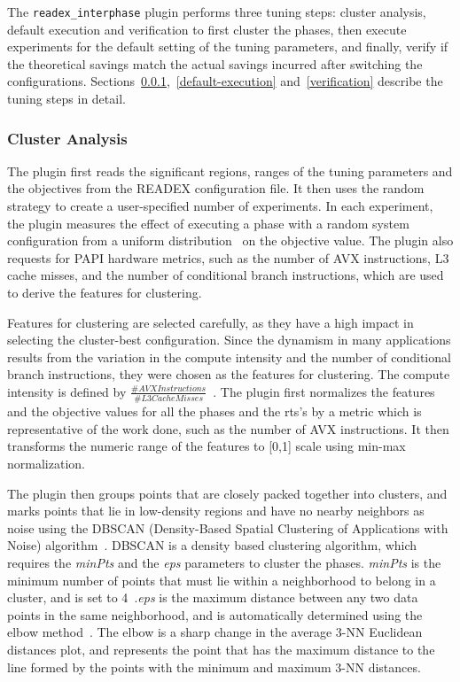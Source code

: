 The \texttt{readex\_interphase} plugin performs three tuning steps: cluster analysis, default execution and verification to first cluster the phases, then execute experiments for the default setting of the tuning parameters, and finally, verify if the theoretical savings match the actual savings incurred after switching the configurations. Sections~\ref{cluster-analysis},~\ref{default-execution} and~\ref{verification} describe the tuning steps in detail.

\subsubsection{Cluster Analysis} \label{cluster-analysis} 
The plugin first reads the significant regions, ranges of the tuning parameters and the objectives from the READEX configuration file. It then uses the random strategy to create a user-specified number of experiments. In each experiment, the plugin measures the effect of executing a phase with a random system configuration from a uniform distribution~\cite{AutoTune:Book2015} on the objective value. The plugin also requests for PAPI hardware metrics, such as the number of AVX instructions, L3 cache misses, and the number of conditional branch instructions, which are used to derive the features for clustering.

Features for clustering are selected carefully, as they have a high impact in selecting the cluster-best configuration. Since the dynamism in many applications results from the variation in the compute intensity and the number of conditional branch instructions, they were chosen as the features for clustering. The compute intensity is defined by $\frac{\#AVX Instructions}{\#L3 Cache Misses}$~\cite{PDPTA_18_Kumaraswamy}. The plugin first normalizes the features and the objective values for all the phases and the rts’s by a metric which is representative of the work done, such as the number of AVX instructions. It then transforms the numeric range of the features to [0,1] scale using min-max normalization.

The plugin then groups points that are closely packed together into clusters, and marks points that lie in low-density regions and have no nearby neighbors as noise using the DBSCAN (Density-Based Spatial Clustering of Applications with Noise) algorithm~\cite{Ester-1996}. DBSCAN is a density based clustering algorithm, which requires the \textit{minPts} and the \textit{eps} parameters to cluster the phases. \textit{minPts} is the minimum number of points that must lie within a neighborhood to belong in a cluster, and is set to 4~\cite{Sander-1998}.\textit{eps} is the maximum distance between any two data points in the same neighborhood, and is automatically determined using the elbow method~\cite{gaonkar2013autoepsdbscan}. The elbow is a sharp change in the average 3-NN Euclidean distances plot, and represents the point that has the maximum distance to the line formed by the points with the minimum and maximum 3-NN distances.

